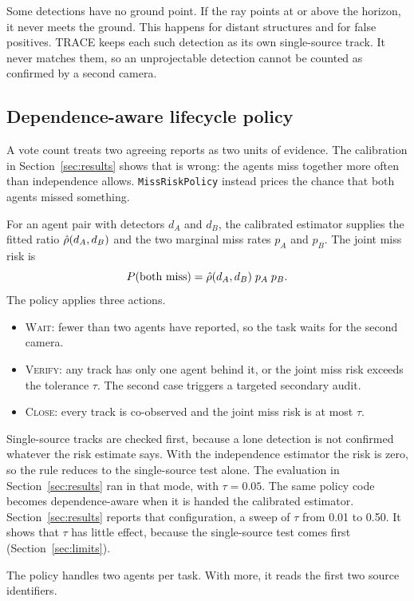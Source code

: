 Some detections have no ground point. If the ray points at or above the
horizon, it never meets the ground. This happens for distant structures and
for false positives. TRACE keeps each such detection as its own single-source
track. It never matches them, so an unprojectable detection cannot be counted
as confirmed by a second camera.

\subsection{Dependence-aware lifecycle policy}
A vote count treats two agreeing reports as two units of evidence. The
calibration in Section~\ref{sec:results} shows that is wrong: the
agents miss together more often than independence allows. \texttt{MissRiskPolicy}
instead prices the chance that both agents missed something.

For an agent pair with detectors $d_A$ and $d_B$, the calibrated estimator
supplies the fitted ratio $\hat{\rho}(d_A,d_B)$ and the two marginal miss
rates $p_A$ and $p_B$. The joint miss risk is
\begin{equation}
  P(\text{both miss}) = \hat{\rho}(d_A,d_B)\; p_A\; p_B .
\end{equation}
The policy applies three actions.
\begin{itemize}
  \item \textsc{Wait}: fewer than two agents have reported, so the task waits
        for the second camera.
  \item \textsc{Verify}: any track has only one agent behind it, or the joint
        miss risk exceeds the tolerance $\tau$. The second case triggers a
        targeted secondary audit.
  \item \textsc{Close}: every track is co-observed and the joint miss risk is
        at most $\tau$.
\end{itemize}
Single-source tracks are checked first, because a lone detection is not
confirmed whatever the risk estimate says. With the independence estimator the
risk is zero, so the rule reduces to the single-source test alone. The
evaluation in Section~\ref{sec:results} ran in that mode, with
$\tau = 0.05$. The same policy code becomes dependence-aware when it is handed
the calibrated estimator. Section~\ref{sec:results} reports that
configuration, a sweep of $\tau$ from 0.01 to 0.50. It shows that $\tau$ has
little effect, because the single-source test comes first
(Section~\ref{sec:limits}).

The policy handles two agents per task. With more, it reads the first two
source identifiers.


